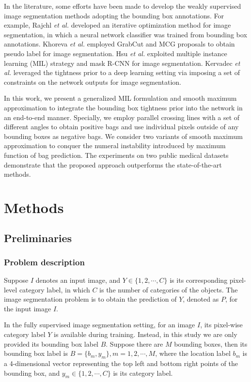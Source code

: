 \documentclass[runningheads]{llncs}
\begin{document}
In the literature, some efforts have been made to develop the weakly supervised image segmentation methods adopting the bounding box annotations. For example, Rajchl \textit{et al.} \cite{rajchl2016deepcut} developed an iterative optimization method for image segmentation, in which a neural network classifier was trained from bounding box annotations. Khoreva \textit{et al.} \cite{khoreva2017simple} employed GrabCut \cite{rother2004grabcut} and MCG proposals \cite{pont2016multiscale} to obtain pseudo label for image segmentation. Hsu \textit{et al.} \cite{hsu2019weakly} exploited multiple instance learning (MIL) strategy and mask R-CNN for image segmentation. Kervadec \textit{et al.} \cite{kervadec2020bounding} leveraged the tightness prior to a deep learning setting via imposing a set of constraints on the network outputs for image segmentation. 

In this work, we present a generalized MIL formulation and smooth maximum approximation to integrate the bounding box tightness prior into the network in an end-to-end manner. Specially, we employ parallel crossing lines with a set of different angles to obtain positive bags and use individual pixels outside of any bounding boxes as negative bags. We consider two variants of smooth maximum approximation to conquer the numeral instability introduced by maximum function of bag prediction.
The experiments on two public medical datasets demonstrate that the proposed approach outperforms the state-of-the-art methods. 

\section{Methods}
\subsection{Preliminaries}

\subsubsection{Problem description}
Suppose $I$ denotes an input image, and $Y \in \{1,2,\cdots,C\}$ is its corresponding pixel-level category label, in which $C$ is the number of categories of the objects. The image segmentation problem is to obtain the prediction of $Y$, denoted as $P$, for the input image $I$. 

In the fully supervised image segmentation setting, for an image $I$, its pixel-wise category label $Y$ is available during training. Instead, in this study we are only provided its bounding box label $B$. Suppose there are $M$ bounding boxes, then its bounding box label is $B = \{b_m, y_m\}, m = 1, 2, \cdots, M$, where the location label $b_m$ is a 4-dimensional vector representing the top left and bottom right points of the bounding box, and $y_m \in \{1,2,\cdots,C\}$ is its category label. 
\end{document}

